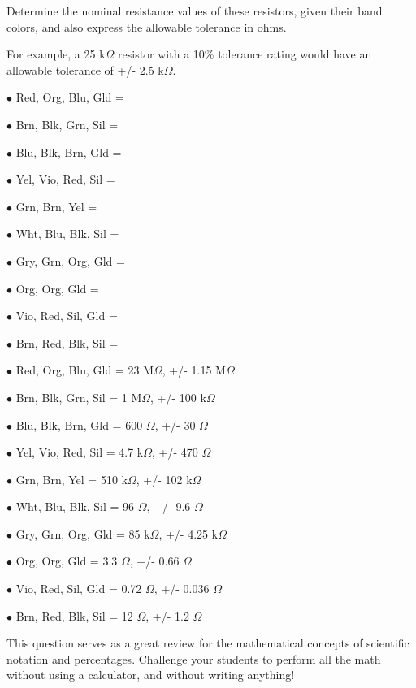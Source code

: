 

Determine the nominal resistance values of these resistors, given their band colors, and also express the allowable tolerance in ohms.

For example, a 25 k$\Omega$ resistor with a 10\% tolerance rating would have an allowable tolerance of +/- 2.5 k$\Omega$.

\medskip
\item{$\bullet$} Red, Org, Blu, Gld = 
\item{$\bullet$} Brn, Blk, Grn, Sil = 
\item{$\bullet$} Blu, Blk, Brn, Gld = 
\item{$\bullet$} Yel, Vio, Red, Sil = 
\item{$\bullet$} Grn, Brn, Yel =      
\item{$\bullet$} Wht, Blu, Blk, Sil =
\item{$\bullet$} Gry, Grn, Org, Gld =
\item{$\bullet$} Org, Org, Gld =
\item{$\bullet$} Vio, Red, Sil, Gld =
\item{$\bullet$} Brn, Red, Blk, Sil =
\medskip







\medskip
\item{$\bullet$} Red, Org, Blu, Gld = 23 M$\Omega$, +/- 1.15 M$\Omega$
\item{$\bullet$} Brn, Blk, Grn, Sil = 1 M$\Omega$, +/- 100 k$\Omega$
\item{$\bullet$} Blu, Blk, Brn, Gld = 600 $\Omega$, +/- 30 $\Omega$
\item{$\bullet$} Yel, Vio, Red, Sil = 4.7 k$\Omega$, +/- 470 $\Omega$
\item{$\bullet$} Grn, Brn, Yel = 510 k$\Omega$, +/- 102 k$\Omega$
\item{$\bullet$} Wht, Blu, Blk, Sil = 96 $\Omega$, +/- 9.6 $\Omega$
\item{$\bullet$} Gry, Grn, Org, Gld = 85 k$\Omega$, +/- 4.25 k$\Omega$
\item{$\bullet$} Org, Org, Gld = 3.3 $\Omega$, +/- 0.66 $\Omega$
\item{$\bullet$} Vio, Red, Sil, Gld = 0.72 $\Omega$, +/- 0.036 $\Omega$
\item{$\bullet$} Brn, Red, Blk, Sil = 12 $\Omega$, +/- 1.2 $\Omega$
\medskip







This question serves as a great review for the mathematical concepts of scientific notation and percentages.  Challenge your students to perform all the math without using a calculator, and without writing anything!




